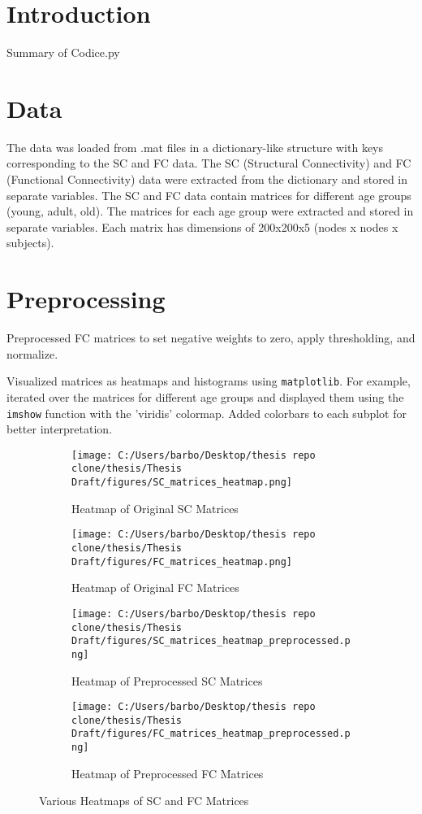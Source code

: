 
\section{Introduction}
Summary of Codice.py

\section{Data}
The data was loaded from .mat files in a dictionary-like structure with keys corresponding to the SC and FC data.
The SC (Structural Connectivity) and FC (Functional Connectivity) data were extracted from the dictionary and stored in separate variables. 
The SC and FC data contain matrices for different age groups (young, adult, old). The matrices for each age group were extracted and stored in separate variables. Each matrix has dimensions of 200x200x5 (nodes x nodes x subjects). 

\section{Preprocessing}


Preprocessed FC matrices to set negative weights to zero, apply thresholding, and normalize.

Visualized matrices as heatmaps and histograms using \texttt{matplotlib}. For example, iterated over the matrices for different age groups and displayed them using the \texttt{imshow} function with the 'viridis' colormap. Added colorbars to each subplot for better interpretation.

\begin{figure}[h!]
    \centering
    \begin{subfigure}[b]{0.45\textwidth}
        \texttt{[image: C:/Users/barbo/Desktop/thesis repo clone/thesis/Thesis Draft/figures/SC\_matrices\_heatmap.png]}
        \caption{Heatmap of Original SC Matrices}
    \end{subfigure}
    \begin{subfigure}[b]{0.45\textwidth}
        \texttt{[image: C:/Users/barbo/Desktop/thesis repo clone/thesis/Thesis Draft/figures/FC\_matrices\_heatmap.png]}
        \caption{Heatmap of Original FC Matrices}
    \end{subfigure}
    \begin{subfigure}[b]{0.45\textwidth}
        \texttt{[image: C:/Users/barbo/Desktop/thesis repo clone/thesis/Thesis Draft/figures/SC\_matrices\_heatmap\_preprocessed.png]}
        \caption{Heatmap of Preprocessed SC Matrices}
    \end{subfigure}
    \begin{subfigure}[b]{0.45\textwidth}
        \texttt{[image: C:/Users/barbo/Desktop/thesis repo clone/thesis/Thesis Draft/figures/FC\_matrices\_heatmap\_preprocessed.png]}
        \caption{Heatmap of Preprocessed FC Matrices}
    \end{subfigure}
    \caption{Various Heatmaps of SC and FC Matrices}
\end{figure}


